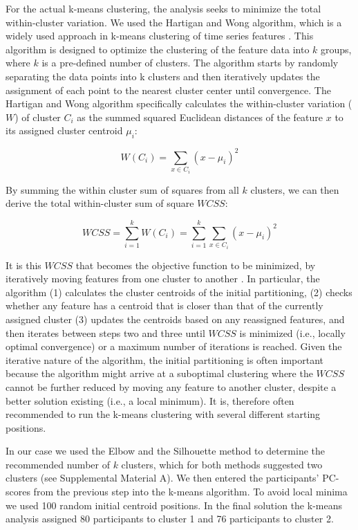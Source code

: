 For the actual k-means clustering, the analysis seeks to minimize the
total within-cluster variation. We used the Hartigan and Wong algorithm,
which is a widely used approach in k-means clustering of time series
features \citep{hartigan1979}. This algorithm is designed to optimize
the clustering of the feature data into \(k\) groups, where \(k\) is a
pre-defined number of clusters. The algorithm starts by randomly
separating the data points into k clusters and then iteratively updates
the assignment of each point to the nearest cluster center until
convergence. The Hartigan and Wong algorithm specifically calculates the
within-cluster variation (\(W\)) of cluster \(C_i\) as the summed
squared Euclidean distances of the feature \(x\) to its assigned cluster
centroid \(\mu_i\):

\begin{equation} \label{eq:kWCi}
  W(C_i) = \sum_{x \in C_i}(x-\mu_i)^2
\end{equation}

By summing the within cluster sum of squares from all \(k\) clusters, we
can then derive the total within-cluster sum of square \(WCSS\):

\begin{equation} \label{eq:kWCSS}
  WCSS = \sum_{i=1}^k W(C_i) = \sum_{i=1}^k \sum_{x \in C_i} (x - \mu_i)^2
\end{equation}

It is this \(WCSS\) that becomes the objective function to be minimized,
by iteratively moving features from one cluster to another
\citep{hartigan1979}. In particular, the algorithm (1) calculates the
cluster centroids of the initial partitioning, (2) checks whether any
feature has a centroid that is closer than that of the currently
assigned cluster (3) updates the centroids based on any reassigned
features, and then iterates between steps two and three until \(WCSS\)
is minimized (i.e., locally optimal convergence) or a maximum number of
iterations is reached. Given the iterative nature of the algorithm, the
initial partitioning is often important because the algorithm might
arrive at a suboptimal clustering where the \(WCSS\) cannot be further
reduced by moving any feature to another cluster, despite a better
solution existing (i.e., a local minimum). It is, therefore often
recommended to run the k-means clustering with several different
starting positions.

In our case we used the Elbow and the Silhouette method to determine the
recommended number of \(k\) clusters, which for both methods suggested
two clusters (see Supplemental Material A). We then entered the
participants' PC-scores from the previous step into the k-means
algorithm. To avoid local minima we used 100 random initial centroid
positions. In the final solution the k-means analysis assigned 80
participants to cluster 1 and 76 participants to cluster 2.
